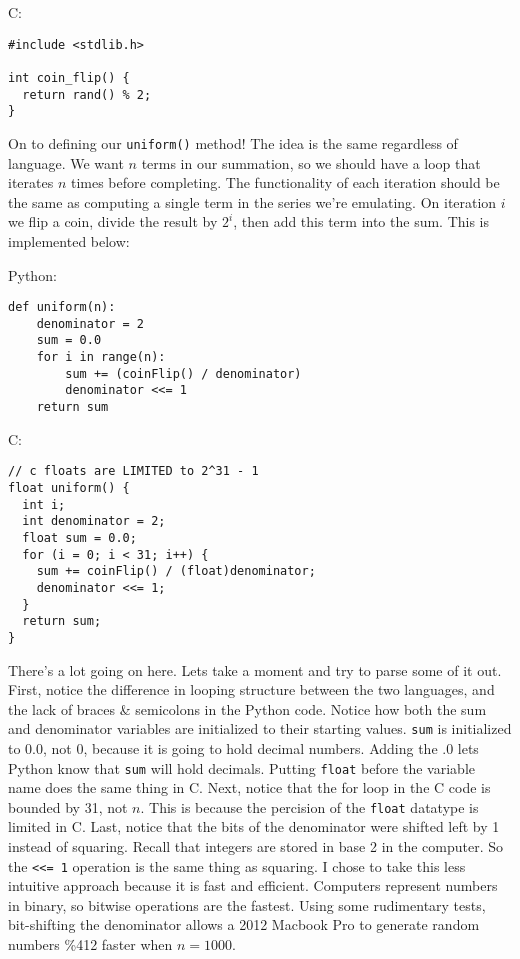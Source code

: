 \documentclass[a4paper]{article}
\begin{document}
C:
\begin{verbatim}
#include <stdlib.h>

int coin_flip() {
  return rand() % 2;
}
\end{verbatim}

On to defining our \texttt{uniform()} method! The idea is the same regardless of language. We want $n$ terms in our summation, so we should have a loop that iterates $n$ times before completing. The functionality of each iteration should be the same as computing a single term in the series we're emulating. On iteration $i$ we flip a coin, divide the result by $2^i$, then add this term into the sum. This is implemented below:

Python:
\begin{verbatim}
def uniform(n):
    denominator = 2
    sum = 0.0
    for i in range(n):
        sum += (coinFlip() / denominator)
        denominator <<= 1
    return sum
\end{verbatim}


C:
\begin{verbatim}
// c floats are LIMITED to 2^31 - 1
float uniform() {
  int i;
  int denominator = 2;
  float sum = 0.0;
  for (i = 0; i < 31; i++) {
    sum += coinFlip() / (float)denominator;
    denominator <<= 1;
  }
  return sum;
}
\end{verbatim}

There's a lot going on here. Lets take a moment and try to parse some of it out. First, notice the difference in looping structure between the two languages, and the lack of braces \& semicolons in the Python code. Notice how both the sum and denominator variables are initialized to their starting values. \texttt{sum} is initialized to 0.0, not 0, because it is going to hold decimal numbers. Adding the .0 lets Python know that \texttt{sum} will hold decimals. Putting \texttt{float} before the variable name does the same thing in C. Next, notice that the for loop in the C code is bounded by 31, not $n$. This is because the percision of the \texttt{float} datatype is limited in C. Last, notice that the bits of the denominator were shifted left by 1 instead of squaring. Recall that integers are stored in base 2 in the computer. So the \texttt{<<= 1} operation is the same thing as squaring. I chose to take this less intuitive approach because it is fast and efficient. Computers represent numbers in binary, so bitwise operations are the fastest. Using some rudimentary tests, bit-shifting the denominator allows a 2012 Macbook Pro to generate random numbers \%412 faster when $n = 1000$.
\end{document}
